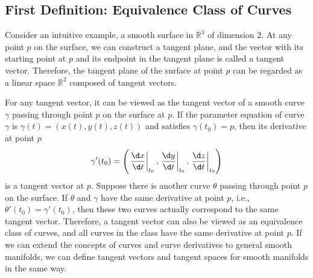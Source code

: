 \documentclass{report}
\begin{document}
\subsection{First Definition: Equivalence Class of Curves}
Consider an intuitive example, a smooth surface in $\mathbb{R}^3$ of dimension $2$. At any point $p$ on the surface, we can construct a tangent plane, and the vector with its starting point at $p$ and its endpoint in the tangent plane is called a tangent vector. Therefore, the tangent plane of the surface at point $p$ can be regarded as a linear space $\mathbb{R}^2$ composed of tangent vectors.

For any tangent vector, it can be viewed as the tangent vector of a smooth curve $\gamma$ passing through point $p$ on the surface at $p$. If the parameter equation of curve $\gamma$ is $\gamma(t)=(x(t),y(t),z(t))$ and satisfies $\gamma(t_0)=p$, then its derivative at point $p$
\[
    \gamma'(t_0)=\left(\left.\frac{\d x}{\d t}\right|_{t_0},\left.\frac{\d y}{\d t}\right|_{t_0}, \left.\frac{\d z}{\d t}\right|_{t_0}\right)
\]
is a tangent vector at $p$. Suppose there is another curve $\theta$ passing through point $p$ on the surface. If $\theta$ and $\gamma$ have the same derivative at point $p$, i.e., $\theta'(t_0)=\gamma'(t_0)$, then these two curves actually correspond to the same tangent vector. Therefore, a tangent vector can also be viewed as an equivalence class of curves, and all curves in the class have the same derivative at point $p$. If we can extend the concepts of curves and curve derivatives to general smooth manifolds, we can define tangent vectors and tangent spaces for smooth manifolds in the same way.
\end{document}
